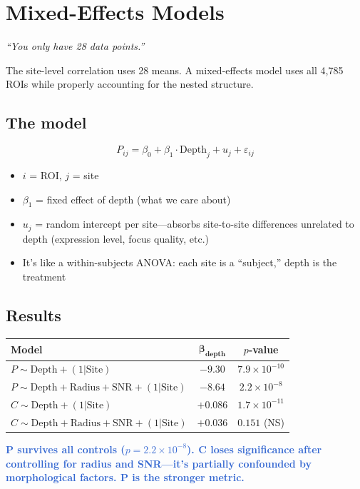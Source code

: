 \documentclass[11pt,letterpaper]{article}
\newcommand{\finding}[1]{\textcolor{highlight}{\textbf{#1}}}
\begin{document}
\section{Mixed-Effects Models}
\textcolor{muted}{\textit{``You only have 28 data points.''}}

The site-level correlation uses 28 means. A mixed-effects model uses all
4,785 ROIs while properly accounting for the nested structure.

\subsection*{The model}
$$P_{ij} = \beta_0 + \beta_1 \cdot \text{Depth}_j + u_j + \varepsilon_{ij}$$

\begin{itemize}[leftmargin=1.5em]
\item $i$ = ROI, $j$ = site
\item $\beta_1$ = fixed effect of depth (what we care about)
\item $u_j$ = random intercept per site---absorbs site-to-site differences
  unrelated to depth (expression level, focus quality, etc.)
\item It's like a within-subjects ANOVA: each site is a ``subject,'' depth
  is the treatment
\end{itemize}

\subsection*{Results}
\begin{center}
\renewcommand{\arraystretch}{1.3}
\begin{tabular}{lcc}
\toprule
\textbf{Model} & $\boldsymbol{\beta_{\textbf{depth}}}$ & \textbf{$p$-value} \\
\midrule
$P \sim \text{Depth} + (1|\text{Site})$ & $-9.30$ & $7.9 \times 10^{-10}$ \\
$P \sim \text{Depth} + \text{Radius} + \text{SNR} + (1|\text{Site})$ & $-8.64$ & $2.2 \times 10^{-8}$ \\
$C \sim \text{Depth} + (1|\text{Site})$ & $+0.086$ & $1.7 \times 10^{-11}$ \\
$C \sim \text{Depth} + \text{Radius} + \text{SNR} + (1|\text{Site})$ & $+0.036$ & $0.151$ (NS) \\
\bottomrule
\end{tabular}
\end{center}

\finding{P survives all controls ($p = 2.2 \times 10^{-8}$). C loses
significance after controlling for radius and SNR---it's partially
confounded by morphological factors. P is the stronger metric.}
\end{document}
